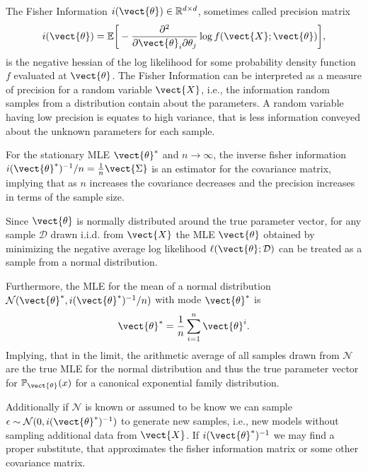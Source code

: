         The Fisher Information $i(\vect{\theta}) \in \mathbb{R}^{d \times d}$, sometimes called precision matrix
        \begin{equation*}
            i(\vect{\theta}) = \mathbb{E}\bigg[- \frac{\partial^2}{\partial \vect{\theta}_i \partial \theta_j} \log f(\vect{X}; \vect{\theta})\bigg] ,
        \end{equation*} 
        is the negative hessian of the log likelihood for some probability density function $f$ evaluated at $\vect{\theta}$.
        The Fisher Information can be interpreted as a measure of precision for a random variable $\vect{X}$, i.e., the information random samples from a distribution contain about the parameters.
        A random variable having low precision is equates to high variance, that is less information conveyed about the unknown parameters for each sample.

        For the stationary MLE $\vect{\theta}^*$  and $n \rightarrow \infty$, the inverse fisher information $i(\vect{\theta}^*)^{-1}/ n = \frac{1}{n} \vect{\Sigma}$ is an estimator for the covariance matrix, implying that as $n$ increases the covariance decreases and the precision increases in terms of the sample size.

        Since $\vect{\theta}$ is normally distributed around the true parameter vector, for any sample $\mathcal{D}$ drawn i.i.d. from $\vect{X}$ the MLE $\vect{\theta}$ obtained by minimizing the negative average log likelihood $\ell(\vect{\theta}; \mathcal{D})$ can be treated as a sample from a normal distribution.

        Furthermore, the MLE for the mean of a normal distribution $\mathcal{N}(\vect{\theta}^*, i(\vect{\theta}^*)^{-1}/n)$ with mode $\vect{\theta}^*$ is
        \begin{equation}
            \vect{\theta}^* = \frac{1}{n} \sum_{i=1}^n \vect{\theta}^{i}.
        \end{equation}
        Implying, that in the limit, the arithmetic average of all samples drawn from $\mathcal{N}$ are the true MLE for the normal distribution and thus the true parameter vector for $\mathbb{P}_{\vect{\theta}}(x)$ for a canonical exponential family distribution.
        
        Additionally if $\mathcal{N}$ is known or assumed to be know we can sample $\epsilon \sim \mathcal{N}(0, i(\vect{\theta}^*)^{-1})$ to generate new samples, i.e., new models without sampling additional data from $\vect{X}$.
        If $ i(\vect{\theta}^*)^{-1}$ we may find a proper substitute, that approximates the fisher information matrix or some other covariance matrix.

